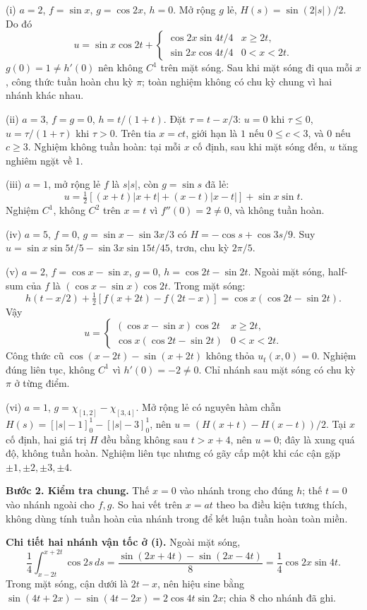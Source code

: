 (i) $a=2$, $f=\sin x$, $g=\cos2x$, $h=0$. Mở rộng $g$ lẻ, $H(s)=\sin(2|s|)/2$. Do đó
\[u=\sin x\cos2t+\begin{cases}\cos2x\sin4t/4&x\ge2t,\\\sin2x\cos4t/4&0<x<2t.\end{cases}\]
$g(0)=1\ne h'(0)$ nên không $C^1$ trên mặt sóng. Sau khi mặt sóng đi qua mỗi $x$, công thức tuần hoàn chu kỳ $\pi$; toàn nghiệm không có chu kỳ chung vì hai nhánh khác nhau.

(ii) $a=3$, $f=g=0$, $h=t/(1+t)$. Đặt $\tau=t-x/3$: $u=0$ khi $\tau\le0$, $u=\tau/(1+\tau)$ khi $\tau>0$. Trên tia $x=ct$, giới hạn là $1$ nếu $0\le c<3$, và $0$ nếu $c\ge3$. Nghiệm không tuần hoàn: tại mỗi $x$ cố định, sau khi mặt sóng đến, $u$ tăng nghiêm ngặt về $1$.

(iii) $a=1$, mở rộng lẻ $f$ là $s|s|$, còn $g=\sin s$ đã lẻ:
\[u=\tfrac12[(x+t)|x+t|+(x-t)|x-t|]+\sin x\sin t.\]
Nghiệm $C^1$, không $C^2$ trên $x=t$ vì $f''(0)=2\ne0$, và không tuần hoàn.

(iv) $a=5$, $f=0$, $g=\sin x-\sin3x/3$ có $H=-\cos s+\cos3s/9$. Suy $u=\sin x\sin5t/5-\sin3x\sin15t/45$, trơn, chu kỳ $2\pi/5$.

(v) $a=2$, $f=\cos x-\sin x$, $g=0$, $h=\cos2t-\sin2t$. Ngoài mặt sóng, half-sum của $f$ là $(\cos x-\sin x)\cos2t$. Trong mặt sóng:
\[h(t-x/2)+\tfrac12[f(x+2t)-f(2t-x)]=\cos x(\cos2t-\sin2t).\]
Vậy
\[u=\begin{cases}(\cos x-\sin x)\cos2t&x\ge2t,\\\cos x(\cos2t-\sin2t)&0<x<2t.\end{cases}\]
Công thức cũ $\cos(x-2t)-\sin(x+2t)$ không thỏa $u_t(x,0)=0$. Nghiệm đúng liên tục, không $C^1$ vì $h'(0)=-2\ne0$. Chỉ nhánh sau mặt sóng có chu kỳ $\pi$ ở từng điểm.

(vi) $a=1$, $g=\chi_{[1,2]}-\chi_{[3,4]}$. Mở rộng lẻ có nguyên hàm chẵn $H(s)=[|s|-1]_0^1-[|s|-3]_0^1$, nên $u=(H(x+t)-H(x-t))/2$. Tại $x$ cố định, hai giá trị $H$ đều bằng không sau $t>x+4$, nên $u=0$; đây là xung quá độ, không tuần hoàn. Nghiệm liên tục nhưng có gãy cấp một khi các cận gặp $\pm1,\pm2,\pm3,\pm4$.

\textbf{Bước 2. Kiểm tra chung.} Thế $x=0$ vào nhánh trong cho đúng $h$; thế $t=0$ vào nhánh ngoài cho $f,g$. So hai vết trên $x=at$ theo ba điều kiện tương thích, không dùng tính tuần hoàn của nhánh trong để kết luận tuần hoàn toàn miền.

\textbf{Chi tiết hai nhánh vận tốc ở (i).} Ngoài mặt sóng,
\[\frac14\int_{x-2t}^{x+2t}\cos2s\,ds
=\frac{\sin(2x+4t)-\sin(2x-4t)}8=\frac14\cos2x\sin4t.\]
Trong mặt sóng, cận dưới là $2t-x$, nên hiệu sine bằng $\sin(4t+2x)-\sin(4t-2x)=2\cos4t\sin2x$; chia $8$ cho nhánh đã ghi.

